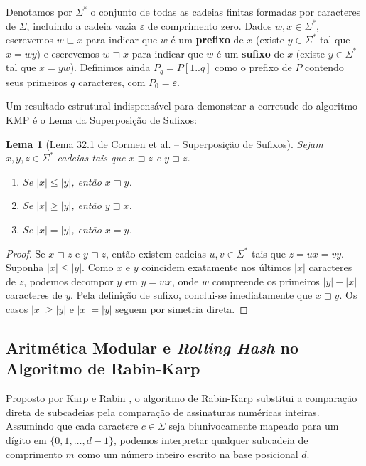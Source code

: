\documentclass[12pt,a4paper]{article}
\newtheorem{lema}{Lema}[section]
\begin{document}
Denotamos por $\Sigma^*$ o conjunto de todas as cadeias finitas formadas por caracteres de $\Sigma$, incluindo a cadeia vazia $\varepsilon$ de comprimento zero. Dados $w, x \in \Sigma^*$, escrevemos $w \sqsubset x$ para indicar que $w$ \'e um \textbf{prefixo} de $x$ (existe $y \in \Sigma^*$ tal que $x = wy$) e escrevemos $w \sqsupset x$ para indicar que $w$ \'e um \textbf{sufixo} de $x$ (existe $y \in \Sigma^*$ tal que $x = yw$). Definimos ainda $P_q = P[1..q]$ como o prefixo de $P$ contendo seus primeiros $q$ caracteres, com $P_0 = \varepsilon$.

Um resultado estrutural indispens\'avel para demonstrar a corretude do algoritmo KMP \'e o Lema da Superposi\c{c}\~ao de Sufixos:

\begin{lema}[Lema 32.1 de Cormen et al. -- Superposi\c{c}\~ao de Sufixos]
\label{lema:superposicao}
Sejam $x, y, z \in \Sigma^*$ cadeias tais que $x \sqsupset z$ e $y \sqsupset z$.
\begin{enumerate}
    \item Se $|x| \le |y|$, ent\~ao $x \sqsupset y$.
    \item Se $|x| \ge |y|$, ent\~ao $y \sqsupset x$.
    \item Se $|x| = |y|$, ent\~ao $x = y$.
\end{enumerate}
\end{lema}
\begin{proof}
Se $x \sqsupset z$ e $y \sqsupset z$, ent\~ao existem cadeias $u, v \in \Sigma^*$ tais que $z = ux = vy$. Suponha $|x| \le |y|$. Como $x$ e $y$ coincidem exatamente nos \'ultimos $|x|$ caracteres de $z$, podemos decompor $y$ em $y = wx$, onde $w$ compreende os primeiros $|y| - |x|$ caracteres de $y$. Pela defini\c{c}\~ao de sufixo, conclui-se imediatamente que $x \sqsupset y$. Os casos $|x| \ge |y|$ e $|x| = |y|$ seguem por simetria direta.
\end{proof}

\subsection{Aritm\'etica Modular e \textit{Rolling Hash} no Algoritmo de Rabin-Karp}

Proposto por Karp e Rabin \cite{karp1987}, o algoritmo de Rabin-Karp substitui a compara\c{c}\~ao direta de subcadeias pela compara\c{c}\~ao de assinaturas num\'ericas inteiras. Assumindo que cada caractere $c \in \Sigma$ seja biunivocamente mapeado para um d\'igito em $\{0, 1, \dots, d-1\}$, podemos interpretar qualquer subcadeia de comprimento $m$ como um n\'umero inteiro escrito na base posicional $d$.
\end{document}
